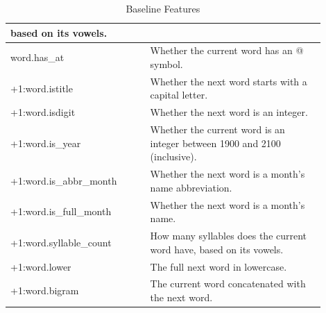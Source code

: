 \documentclass[a4paper, conference]{ieeeconf}
\begin{document}
\begin{table}[ht!]
\begin{tabular}{|p{0.4\linewidth}|p{0.5\linewidth}|}
      based on its vowels. \\
      \hline
      \rowcolor{blue}
      word.has\_at & Whether the current word has an @ symbol. \\
      \hline
      \rowcolor{light_blue}
      +1:word.istitle & Whether the next word starts with a capital letter. \\
      \hline
      \rowcolor{light_blue}
      +1:word.isdigit & Whether the next word is an integer. \\
      \hline
      \rowcolor{light_blue}
      +1:word.is\_year & Whether the current word is an integer between 1900
      and 2100 (inclusive). \\
      \hline
      \rowcolor{light_blue}
      +1:word.is\_abbr\_month & Whether the next word is a month's name
      abbreviation. \\
      \hline
      \rowcolor{light_blue}
      +1:word.is\_full\_month & Whether the next word is a month's name. \\
      \hline
      \rowcolor{light_blue}
      +1:word.syllable\_count & How many syllables does the current word have,
      based on its vowels. \\
      \hline
      \rowcolor{light_blue}
      +1:word.lower & The full next word in lowercase. \\
      \hline
      \rowcolor{light_blue}
      +1:word.bigram & The current word concatenated with the next word. \\
      \hline
    \end{tabular}
    \caption{Baseline Features}
    \label{table:1}
  \end{table}
\end{document}
